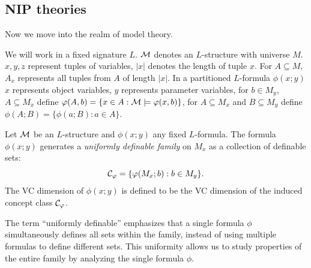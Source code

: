 \newpage

\subsection{NIP theories}
\label{section:NIPtheories}
Now we move into the realm of model theory.

\begin{remark}[Notation]
\begin{outline}
\0 We will work in a fixed signature $L$. 
    \1 $\mathcal{M}$ denotes an $L$-structure with universe $M$.
    \1 $x,y,z$ represent tuples of variables,
    \1 $|x|$ denotes the length of tuple $x$.
    \1 For $A\subseteq M$, $A_x$ represents all tuples from $A$ of length $|x|$. 
\0 In a partitioned $L$-formula $\phi(x;y)$
    \1 $x$ represents object variables, 
    \1 $y$ represents parameter variables,
    \1 for $b\in M_y$, $A\subseteq M_x$ define $\varphi(A,b)=\{x\in A : \mathcal{M}\models \varphi(x,b)\}$,
    \1 for $A\subseteq M_x$ and $B\subseteq M_y$ define $\phi(A;B)=\{\phi(a;B) : a\in A\}$.
\end{outline}
\end{remark}

\begin{definition}
\begin{outline}
\0 Let $\mathcal{M}$ be an $L$-structure and $\phi(x;y)$ any fixed $L$-formula. The formula $\phi(x;y)$ generates a \emph{uniformly definable family} on $M_x$ as a collection of definable sets: 
$$\mathcal{C}_\varphi = \{\varphi(M_x;b) : b \in M_y\}.$$
\0 The VC dimension of $\phi(x;y)$ is defined to be the VC dimension of the induced concept class $\mathcal{C}_\varphi$.
\end{outline}
\end{definition}

The term \enquote{uniformly definable} emphasizes that a single formula $\phi$ simultaneously defines all sets within the family, instead of using multiple formulas to define different sets. This uniformity allows us to study properties of the entire family by analyzing the single formula $\phi$.

